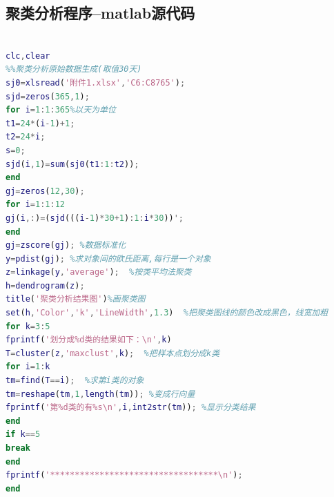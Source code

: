 \documentclass{whutmod}
\begin{document}
\subsection{聚类分析程序--matlab源代码}
\begin{lstlisting}[language=matlab]

clc,clear
%%聚类分析原始数据生成(取值30天)
sj0=xlsread('附件1.xlsx','C6:C8765');
sjd=zeros(365,1);
for i=1:1:365%以天为单位
t1=24*(i-1)+1;
t2=24*i;
s=0;
sjd(i,1)=sum(sj0(t1:1:t2));
end
gj=zeros(12,30);
for i=1:1:12
gj(i,:)=(sjd(((i-1)*30+1):1:i*30))';
end
gj=zscore(gj); %数据标准化
y=pdist(gj); %求对象间的欧氏距离,每行是一个对象
z=linkage(y,'average');  %按类平均法聚类
h=dendrogram(z);
title('聚类分析结果图')%画聚类图
set(h,'Color','k','LineWidth',1.3)  %把聚类图线的颜色改成黑色，线宽加粗
for k=3:5
fprintf('划分成%d类的结果如下：\n',k)
T=cluster(z,'maxclust',k);  %把样本点划分成k类
for i=1:k
tm=find(T==i);  %求第i类的对象
tm=reshape(tm,1,length(tm)); %变成行向量
fprintf('第%d类的有%s\n',i,int2str(tm)); %显示分类结果
end
if k==5
break
end
fprintf('**********************************\n');
end
\end{lstlisting}
\end{document}

